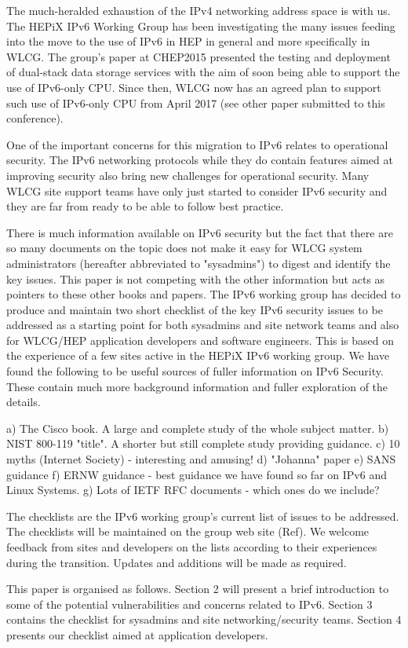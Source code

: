The much-heralded exhaustion of the IPv4 networking address space is with us. The HEPiX
IPv6 Working Group \cite{ipv6wg} has been investigating the many issues feeding into the move to the use of IPv6 in HEP in general and more specifically in WLCG. The group's paper at CHEP2015 \cite{ipv6chep2015} presented the testing and deployment of dual-stack data storage services with the aim of soon being able to support the use of IPv6-only CPU. Since then, WLCG now has an agreed plan to support such use of IPv6-only CPU from April 2017 (see other paper submitted to this conference).

One of the important concerns for this migration to IPv6 relates to operational security. The IPv6 networking protocols while they do contain features aimed at improving security also bring new challenges for operational security. Many WLCG site support teams have only just started to consider IPv6 security and they are far from ready to be able to follow best practice. 

There is much information available on IPv6 security but the fact that there are so many documents on the topic does not make it easy for WLCG system administrators (hereafter abbreviated to "sysadmins") to digest and identify the key issues. This paper is not competing with the other information but acts as pointers to these other books and papers. The IPv6 working group has decided to produce and maintain two short checklist of the key IPv6 security issues to be addressed as a starting point for both sysadmins and site network teams and also for WLCG/HEP application developers and software engineers. This is based on the experience of a few sites active in the HEPiX IPv6 working group. 
We have found the following to be useful sources of fuller information on IPv6 Security. These contain much more background information and fuller exploration of the details.

a) The Cisco book. A large and complete study of the whole subject matter.
b) NIST 800-119 "title". A shorter but still complete study providing guidance.
c) 10 myths (Internet Society) - interesting and amusing!
d) "Johanna" paper
e) SANS guidance
f) ERNW guidance - best guidance we have found so far on IPv6 and Linux Systems.
g) Lots of IETF RFC documents - which ones do we include?

The checklists are the IPv6 working group's current list of issues to be addressed. The checklists will be maintained on the group web site (Ref). We welcome feedback from sites and developers on the lists according to their experiences during the transition. Updates and additions will be made as required.

This paper is organised as follows. Section 2 will present a brief introduction to some of the potential vulnerabilities and concerns related to IPv6. Section 3 contains the checklist for sysadmins and site networking/security teams. Section 4 presents our checklist aimed at application developers.





